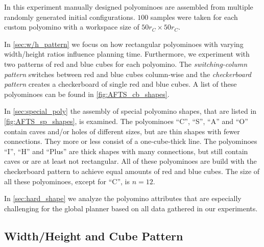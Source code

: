 In this experiment manually designed polyominoes are assembled from multiple randomly generated initial configurations.
$100$ samples were taken for each custom polyomino with a workspace size of $50 r_C \times 50 r_C$.

In \autoref{sec:w/h_pattern} we focus on how rectangular polyominoes with varying width/height ratios influence planning time.
Furthermore, we experiment with two patterns of red and blue cubes for each polyomino.
The \textit{switching-column pattern} switches between red and blue cubes column-wise and the \textit{checkerboard pattern} creates a checkerboard of single red and blue cubes.
A list of these polyominoes can be found in \autoref{fig:AFTS_cb_shapes}.

In \autoref{sec:special_poly} the assembly of special polyomino shapes, that are listed in \autoref{fig:AFTS_sp_shapes}, is examined. 
The polyominoes ``C'', ``S'', ``A'' and ``O'' contain caves and/or holes of different sizes, but are thin shapes with fewer connections.
They more or less consist of a one-cube-thick line.
The polyominoes ``I'', ``H'' and ``Plus'' are thick shapes with many connections, but still contain caves or are at least not rectangular.
All of these polyominoes are build with the checkerboard pattern to achieve equal amounts of red and blue cubes.
The size of all these polyominoes, except for ``C'', is $n=12$.
 
In \autoref{sec:hard_shape} we analyze the polyomino attributes that are especially challenging for the global planner based on all data gathered in our experiments.

\subsection{Width/Height and Cube Pattern}
\label{sec:w/h_pattern}

